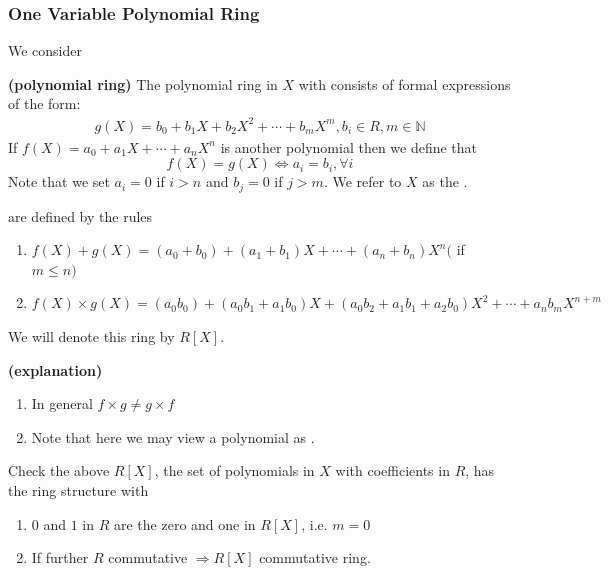 \documentclass{article}
\newcommand{\bfs}[1]{\textbf{({#1}) }}
\begin{document}
\subsubsection{One Variable Polynomial Ring}
We consider 
\begin{defa}\bfs{polynomial ring}
 The polynomial ring in $X$ with  consists of formal expressions of the form:
\begin{align*}
g(X)=b_{0}+b_{1} X+b_{2} X^{2}+\cdots+b_{m} X^{m}, b_{i} \in R, m \in \mathbb{N}
\end{align*}
If $f(X)=a_{0}+a_{1} X+\cdots+a_{n} X^{n}$ is another polynomial then we define that 
$$f(X)=g(X) \Longleftrightarrow a_{i}=b_{i}, \forall i$$ 
Note that we set $a_{i}=0$ if $i>n$ and $b_{j}=0$ if $j>m$. 
We refer to $X$ as the .

 are defined by the rules
\begin{enumerate}
    \item $f(X)+g(X)=\left(a_{0}+b_{0}\right)+\left(a_{1}+b_{1}\right) X+\cdots+\left(a_{n}+b_{n}\right) X^{n}($ if $m \leq n)$
    \item $f(X) \times g(X)=\left(a_{0} b_{0}\right)+\left(a_{0} b_{1}+a_{1} b_{0}\right) X+\left(a_{0} b_{2}+a_{1} b_{1}+a_{2} b_{0}\right) X^{2}+\cdots+a_{n} b_{m} X^{n+m}$
\end{enumerate}
We will denote this ring by $R[X]$. 
\end{defa}
\begin{rema}\bfs{explanation}
\begin{enumerate}
    \item In general $f\times g \ne g\times f$
    \item Note that here we may view a polynomial as . 
\end{enumerate}
\end{rema}
\begin{lema}
Check the above $R[X]$, the set of polynomials in $X$ with coefficients in $R$, has  the ring structure with
\begin{enumerate}
    \item $0$ and $1$ in $R$ are the zero and one in $R[X]$, i.e. $m=0$
    \item If further $R$ commutative $\Rightarrow R[X]$ commutative ring.
\end{enumerate}
\end{lema}
\end{document}
